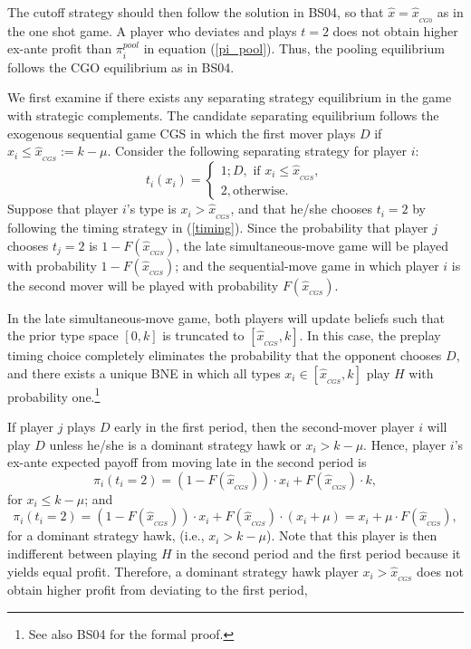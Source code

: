 \documentclass[12pt, letterpaper]{article}
\theoremstyle{plain}
\begin{document}
The cutoff strategy should then follow the solution in BS04, so that $\hat{x}=\hat{x}_{_{CG0}}$ as in the one shot game. A player who deviates and plays $t=2$ does not obtain higher ex-ante profit than $\pi^{pool}_{i}$  in equation (\ref{pi_pool}). Thus, the pooling equilibrium follows the CGO equilibrium as in BS04. 

We first examine if there exists any separating strategy equilibrium in the game with strategic complements. The candidate separating equilibrium follows the exogenous sequential game CGS in which the first mover plays $D$ if $x_i\leq \hat{x}_{_{CGS}}:= k-\mu$. Consider the following separating strategy for player $i $:
\begin{equation}
 t_i(x_i)=
 \begin{cases} 1; D, \mbox{ if } x_i  \leq \hat{x}_{_{CGS}}, \\
 2,  \text{otherwise}.
 \end{cases}
 \label{timing}
\end{equation}
Suppose that player $i$'s type is $x_i >\hat{x}_{_{CGS}}$, and that he/she chooses $t_i=2$ by following the timing strategy  in (\ref{timing}).  Since the probability that player $j$ chooses $t_j=2$ is $1-F(\hat{x}_{_{CGS}})$, the late simultaneous-move game will be played with probability $1-F(\hat{x}_{_{CGS}})$; and the sequential-move game in which player $i$ is the second mover will be played with probability $F(\hat{x}_{_{CGS}})$.

In the late simultaneous-move game, both players will update beliefs such that the prior type space $[0, k]$ is truncated to $[\hat{x}_{_{CGS}},k]$. In this case, the preplay timing choice completely eliminates the probability that the opponent chooses $D$, and there exists a unique BNE in which all types $x_i \in [\hat{x}_{_{CGS}},k]$ play $H$ with probability one.\footnote{See also BS04 for the formal proof.} 
 
If player $j$ plays $D$ early in the first period, then the second-mover player $i$ will play $D$ unless he/she is a dominant strategy hawk or $x_i>k-\mu$. Hence, player $i$'s ex-ante expected payoff from moving late in the second period is
\begin{equation}
\pi_i(t_i=2)=(1-F(\hat{x}_{_{CGS}}))\cdot x_i+F(\hat{x}_{_{CGS}}) \cdot k,
\end{equation}
for $x_i\leq k-\mu$; and
\begin{equation}
\pi_i(t_i=2)=(1-F(\hat{x}_{_{CGS}}))\cdot x_i+F(\hat{x}_{_{CGS}}) \cdot (x_i+\mu)=x_i + \mu\cdot  F(\hat{x}_{_{CGS}}),
\end{equation}for a dominant strategy hawk, (i.e., $x_i> k-\mu$). Note that this player is then indifferent between playing $H$ in the second period and the first period because it yields equal profit. Therefore, a dominant strategy hawk player $x_i>\hat{x}_{_{CGS}}$ does not obtain higher profit from deviating to the first period, 
\end{document}
